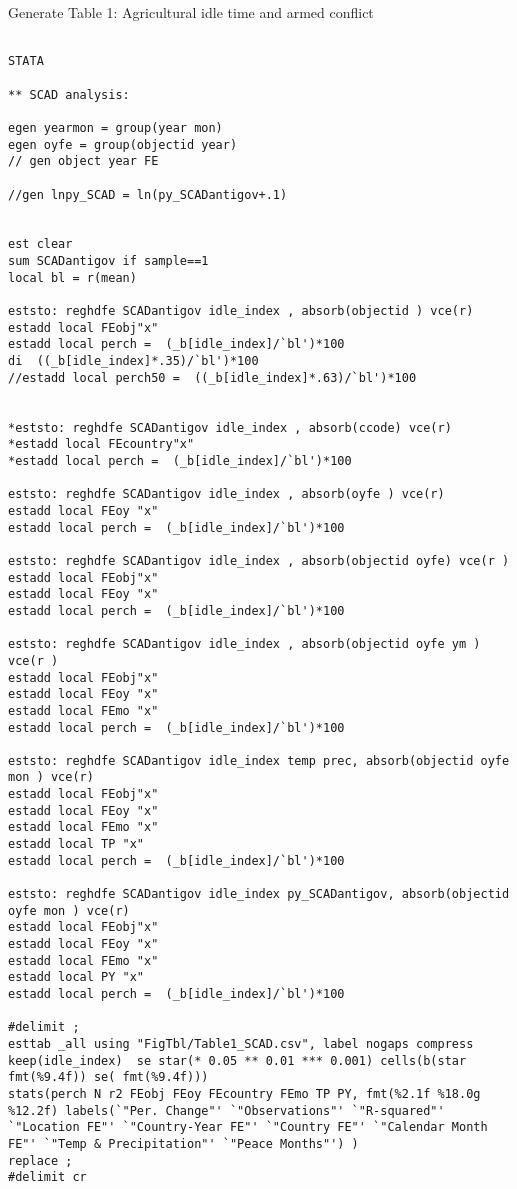 \documentclass[12pt,letterpaper]{article}
\begin{document}
Generate Table 1: Agricultural idle time and armed conflict

\begin{lstlisting}

STATA	
			
** SCAD analysis:

egen yearmon = group(year mon) 
egen oyfe = group(objectid year)
// gen object year FE

//gen lnpy_SCAD = ln(py_SCADantigov+.1)


est clear 
sum SCADantigov if sample==1 
local bl = r(mean) 

eststo: reghdfe SCADantigov idle_index , absorb(objectid ) vce(r)  
estadd local FEobj"x"
estadd local perch =  (_b[idle_index]/`bl')*100
di  ((_b[idle_index]*.35)/`bl')*100
//estadd local perch50 =  ((_b[idle_index]*.63)/`bl')*100


*eststo: reghdfe SCADantigov idle_index , absorb(ccode) vce(r)  
*estadd local FEcountry"x"
*estadd local perch =  (_b[idle_index]/`bl')*100

eststo: reghdfe SCADantigov idle_index , absorb(oyfe ) vce(r)  
estadd local FEoy "x"
estadd local perch =  (_b[idle_index]/`bl')*100

eststo: reghdfe SCADantigov idle_index , absorb(objectid oyfe) vce(r )  
estadd local FEobj"x"
estadd local FEoy "x"
estadd local perch =  (_b[idle_index]/`bl')*100

eststo: reghdfe SCADantigov idle_index , absorb(objectid oyfe ym ) vce(r )  
estadd local FEobj"x"
estadd local FEoy "x"
estadd local FEmo "x"
estadd local perch =  (_b[idle_index]/`bl')*100

eststo: reghdfe SCADantigov idle_index temp prec, absorb(objectid oyfe mon ) vce(r)  
estadd local FEobj"x"
estadd local FEoy "x"
estadd local FEmo "x"
estadd local TP "x"
estadd local perch =  (_b[idle_index]/`bl')*100

eststo: reghdfe SCADantigov idle_index py_SCADantigov, absorb(objectid oyfe mon ) vce(r)  
estadd local FEobj"x"
estadd local FEoy "x"
estadd local FEmo "x"
estadd local PY "x"
estadd local perch =  (_b[idle_index]/`bl')*100

#delimit ; 
esttab _all using "FigTbl/Table1_SCAD.csv", label nogaps compress 
keep(idle_index)  se star(* 0.05 ** 0.01 *** 0.001) cells(b(star fmt(%9.4f)) se( fmt(%9.4f)))
stats(perch N r2 FEobj FEoy FEcountry FEmo TP PY, fmt(%2.1f %18.0g %12.2f) labels(`"Per. Change"' `"Observations"' `"R-squared"' `"Location FE"' `"Country-Year FE"' `"Country FE"' `"Calendar Month FE"' `"Temp & Precipitation"' `"Peace Months"') )
replace ; 
#delimit cr 



\end{lstlisting}
\end{document}
